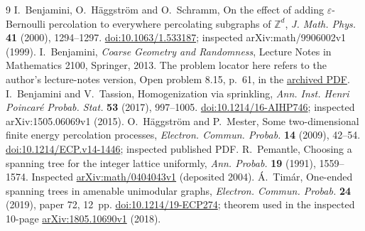 \documentclass[11pt]{article}
\newcommand{\Z}{\mathbb Z}
\begin{document}
\begin{thebibliography}{9}
 I.~Benjamini, O.~H\"aggstr\"om and O.~Schramm,
On the effect of adding $\varepsilon$-Bernoulli percolation to everywhere percolating subgraphs of $\Z^d$,
\emph{J. Math. Phys.} \textbf{41} (2000), 1294--1297.
\href{https://doi.org/10.1063/1.533187}{doi:10.1063/1.533187}; inspected arXiv:math/9906002v1 (1999).
 I.~Benjamini, \emph{Coarse Geometry and Randomness}, Lecture Notes in Mathematics 2100, Springer, 2013.
The problem locator here refers to the author's lecture-notes version, Open problem 8.15, p.~61, in the \href{https://arquivo.pt/noFrame/replay/20201231041548id_/http://www.wisdom.weizmann.ac.il/~itai/stflouraug24.pdf}{archived PDF}.
 I.~Benjamini and V.~Tassion, Homogenization via sprinkling,
\emph{Ann. Inst. Henri Poincar\'e Probab. Stat.} \textbf{53} (2017), 997--1005.
\href{https://doi.org/10.1214/16-AIHP746}{doi:10.1214/16-AIHP746}; inspected arXiv:1505.06069v1 (2015).
 O.~H\"aggstr\"om and P.~Mester, Some two-dimensional finite energy percolation processes,
\emph{Electron. Commun. Probab.} \textbf{14} (2009), 42--54.
\href{https://doi.org/10.1214/ECP.v14-1446}{doi:10.1214/ECP.v14-1446}; inspected published PDF.
 R.~Pemantle, Choosing a spanning tree for the integer lattice uniformly,
\emph{Ann. Probab.} \textbf{19} (1991), 1559--1574.
Inspected \href{https://arxiv.org/abs/math/0404043v1}{arXiv:math/0404043v1} (deposited 2004).
 \'A.~Tim\'ar, One-ended spanning trees in amenable unimodular graphs,
\emph{Electron. Commun. Probab.} \textbf{24} (2019), paper 72, 12~pp.
\href{https://doi.org/10.1214/19-ECP274}{doi:10.1214/19-ECP274}; theorem used in the inspected 10-page \href{https://arxiv.org/abs/1805.10690v1}{arXiv:1805.10690v1} (2018).
\end{thebibliography}
\end{document}

